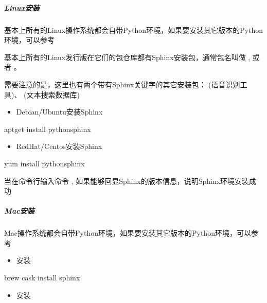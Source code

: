 \documentclass[a4paper,10pt,english]{sphinxmanual}
\begin{document}
\subparagraph{Linux安装}
\label{\detokenize{sphinx/1-generate/2-install:linux}}
基本上所有的Linux操作系统都会自带Python环境，如果要安装其它版本的Python环境，可以参考 

基本上所有的Linux发行版在它们的包仓库都有Sphinx安装包，通常包名叫做  ,  或者  。

需要注意的是，这里也有两个带有Sphinx关键字的其它安装包： (语音识别工具)、 (文本搜索数据库)
\begin{itemize}
\item {} 
Debian/Ubuntu安装Sphinx

\end{itemize}

\begin{sphinxVerbatim}[commandchars=\\\{\}]
\PYGZdl{} apt\PYGZhy{}get install python\PYGZhy{}sphinx
\end{sphinxVerbatim}
\begin{itemize}
\item {} 
RedHat/Centos安装Sphinx

\end{itemize}

\begin{sphinxVerbatim}[commandchars=\\\{\}]
\PYGZdl{} yum install python\PYGZhy{}sphinx
\end{sphinxVerbatim}

当在命令行输入命令  , 如果能够回显Sphinx的版本信息，说明Sphinx环境安装成功

\begin{figure}[htbp]
\centering

\noindent{}
\end{figure}


\subparagraph{Mac安装}
\label{\detokenize{sphinx/1-generate/2-install:mac}}
Mac操作系统都会自带Python环境，如果要安装其它版本的Python环境，可以参考 
\begin{itemize}
\item {} 
 安装

\end{itemize}

\begin{sphinxVerbatim}[commandchars=\\\{\}]
\PYGZdl{} brew cask install sphinx
\end{sphinxVerbatim}
\begin{itemize}
\item {} 
 安装

\end{itemize}
\end{document}
